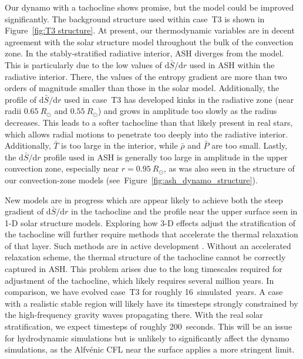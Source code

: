 Our dynamo with a tachocline shows promise, but the model could be
improved significantly.  The background structure used within case~T3
is shown in Figure~\ref{fig:T3 structure}.  
At present, our thermodynamic variables are in decent agreement with
the solar structure model \citep[a CESAM model based on work
  in][]{Brun_et_al_2002} throughout the bulk of the convection zone.
In the stably-stratified radiative interior, ASH diverges from the
model.  This is particularly due to the low values of
$\mathrm{d}\bar{S}/\mathrm{d}r$ used in ASH within the radiative
interior.  There, the values of the entropy gradient are more than two
orders of magnitude smaller than those in the solar model.
Additionally, the profile of $\mathrm{d}\bar{S}/\mathrm{d}r$ used in
case~T3 has developed kinks in the radiative zone (near radii
$0.65\:R_\odot$ and $0.55\:R_\odot$) and grows in amplitude too slowly
as the radius decreases.  This leads to a softer tachocline than that
likely present in real stars, which allows radial motions to penetrate
too deeply into the radiative interior.  Additionally, $\bar{T}$ is
too large in the interior, while $\bar{\rho}$ and $\bar{P}$ are too
small.  Lastly, the $\mathrm{d}\bar{S}/\mathrm{d}r$ profile used in
ASH is generally too large in amplitude in the upper convection zone,
especially near $r=0.95\:R_\odot$, as was also seen in the structure
of our convection-zone models (see~Figure~\ref{fig:ash_dynamo_structure}).

\clearpage
New models are in progress which are appear likely to achieve both the
steep gradient of $\mathrm{d}\bar{S}/\mathrm{d}r$ in the tachocline
and the profile near the upper surface seen in 1-D solar structure
models.  Exploring how 3-D effects adjust the stratification of the
tachocline will further require methods that accelerate the thermal
relaxation of that layer.  Such methods are in active development
\citep{Featherstone_et_al_2010}.  Without an accelerated relaxation
scheme, the thermal structure of the tachocline cannot be correctly
captured in ASH. This problem arises due to the long timescales
required for adjustment of the tachocline, which likely requires
several million years.  In comparison, we have evolved case~T3 for
roughly 16~simulated~years.  A case with a realistic stable region
will likely have its timesteps strongly constrained by the
high-frequency gravity waves propagating there.  With the real solar
stratification, we expect timesteps of roughly 200~seconds.  This
will be an issue for hydrodynamic simulations but is unlikely to
significantly affect the dynamo simulations, as the Alfv\'enic CFL
near the surface applies a more stringent limit.  

